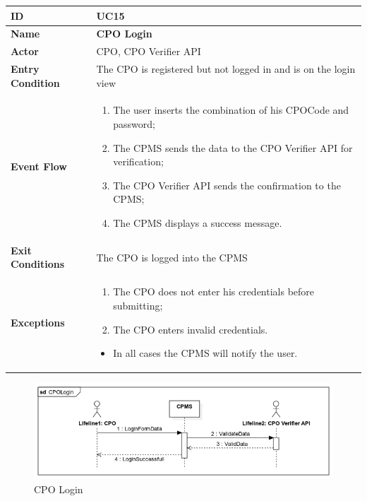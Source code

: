 \documentclass{Configuration_Files/PoliMi3i_thesis}
\begin{document}

\newpage\begin{table}[H]
    \begin{xltabular}{\textwidth}{| >{}l | X |}
    \hline
    \textbf{ID} & \textbf{UC15}\T\B\\
    \hline
    \textbf{Name} & \textbf{CPO Login}\T\B\\
    \hline \hline
    \textbf{Actor} & CPO, CPO Verifier API\T\B \\
    \hline
    \textbf{Entry Condition} & The CPO is registered but not logged in and is on the login view\T\B\\
    \hline
    \textbf{Event Flow} & 
        \begin{enumerate}
        \item The user inserts the combination of his CPOCode and password;
        \item The CPMS sends the data to the CPO Verifier API for verification;
        \item The CPO Verifier API sends the confirmation to the CPMS;
        \item The CPMS displays a success message.
        \end{enumerate}\B\\
    \hline
    \textbf{Exit Conditions} & The CPO is logged into the CPMS\B\\
    \hline
    \textbf{Exceptions} & \begin{enumerate}
        \item The CPO does not enter his credentials before submitting;
        \item The CPO enters invalid credentials.
        \end{enumerate}
        \begin{itemize}
            \item In all cases the CPMS will notify the user.
        \end{itemize}\B\\
    \hline
    \end{xltabular}
\end{table}

\begin{figure}[H]
    \centering
    \includegraphics[width=1\textwidth]{Images/UseCases/CPOLogin.jpg}
    \caption{CPO Login}
\end{figure}
\end{document}
